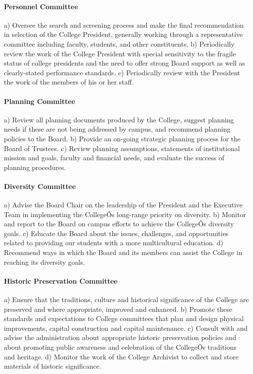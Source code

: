 \documentclass[letterpaper, 11pt]{article}
\begin{document}
			\paragraph{Personnel Committee}
				a) Oversee the search and screening process and make the final recommendation in selection of the College President, generally working through a representative committee including faculty, students, and other constituents.
				b) Periodically review the work of the College President with special sensitivity to the fragile status of college presidents and the need to offer strong Board support as well as clearly-stated performance standards.
				c) Periodically review with the President the work of the members of his or her staff.
			\paragraph{Planning Committee}
				a) Review all planning documents produced by the College, suggest planning needs if these are not being addressed by campus, and recommend planning policies to the Board.
				b) Provide an on-going strategic planning process for the Board of Trustees.
				c) Review planning assumptions, statements of institutional mission and goals, faculty and financial needs, and evaluate the success of planning procedures.
			\paragraph{Diversity Committee}
				a) Advise the Board Chair on the leadership of the President and the Executive Team in implementing the CollegeÕs long-range priority on diversity.
				b) Monitor and report to the Board on campus efforts to achieve the CollegeÕs diversity goals.
				c) Educate the Board about the issues, challenges, and opportunities related to providing our students with a more multicultural education.
				d) Recommend ways in which the Board and its members can assist the College in reaching its diversity goals.
			\paragraph{Historic Preservation Committee}
				a) Ensure that the traditions, culture and historical significance of the College are preserved and where appropriate, improved and enhanced.
				b) Promote these standards and expectations to College committees that plan and design physical improvements, capital construction and capital maintenance.
				c) Consult with and advise the administration about appropriate historic preservation policies and about promoting public awareness and celebration of the CollegeÕs traditions and heritage.
				d) Monitor the work of the College Archivist to collect and store materials of historic significance.
\end{document}
